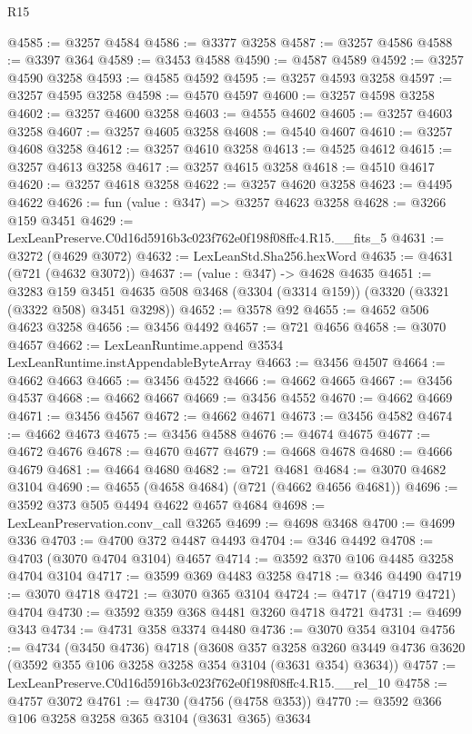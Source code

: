 \begin{lexlean}{R15}
\begin{coremodule}
@4585 := @3257 @4584
@4586 := @3377 @3258
@4587 := @3257 @4586
@4588 := @3397 @364
@4589 := @3453 @4588
@4590 := @4587 @4589
@4592 := @3257 @4590 @3258
@4593 := @4585 @4592
@4595 := @3257 @4593 @3258
@4597 := @3257 @4595 @3258
@4598 := @4570 @4597
@4600 := @3257 @4598 @3258
@4602 := @3257 @4600 @3258
@4603 := @4555 @4602
@4605 := @3257 @4603 @3258
@4607 := @3257 @4605 @3258
@4608 := @4540 @4607
@4610 := @3257 @4608 @3258
@4612 := @3257 @4610 @3258
@4613 := @4525 @4612
@4615 := @3257 @4613 @3258
@4617 := @3257 @4615 @3258
@4618 := @4510 @4617
@4620 := @3257 @4618 @3258
@4622 := @3257 @4620 @3258
@4623 := @4495 @4622
@4626 := fun (value : @347) => @3257 @4623 @3258
@4628 := @3266 @159 @3451
@4629 := LexLeanPreserve.C0d16d5916b3c023f762e0f198f08ffc4.R15.__fits_5
@4631 := @3272 (@4629 @3072)
@4632 := LexLeanStd.Sha256.hexWord
@4635 := @4631 (@721 (@4632 @3072))
@4637 := (value : @347) -> @4628 @4635
@4651 := @3283
    @159
    @3451
    @4635
    @508
    @3468
    (@3304 (@3314 @159))
    (@3320 (@3321 (@3322 @508) @3451 @3298))
@4652 := @3578 @92
@4655 := @4652 @506 @4623 @3258
@4656 := @3456 @4492
@4657 := @721 @4656
@4658 := @3070 @4657
@4662 := LexLeanRuntime.append @3534 LexLeanRuntime.instAppendableByteArray
@4663 := @3456 @4507
@4664 := @4662 @4663
@4665 := @3456 @4522
@4666 := @4662 @4665
@4667 := @3456 @4537
@4668 := @4662 @4667
@4669 := @3456 @4552
@4670 := @4662 @4669
@4671 := @3456 @4567
@4672 := @4662 @4671
@4673 := @3456 @4582
@4674 := @4662 @4673
@4675 := @3456 @4588
@4676 := @4674 @4675
@4677 := @4672 @4676
@4678 := @4670 @4677
@4679 := @4668 @4678
@4680 := @4666 @4679
@4681 := @4664 @4680
@4682 := @721 @4681
@4684 := @3070 @4682 @3104
@4690 := @4655 (@4658 @4684) (@721 (@4662 @4656 @4681))
@4696 := @3592 @373 @505 @4494 @4622 @4657 @4684
@4698 := LexLeanPreservation.conv_call @3265
@4699 := @4698 @3468
@4700 := @4699 @336
@4703 := @4700 @372 @4487 @4493
@4704 := @346 @4492
@4708 := @4703 (@3070 @4704 @3104) @4657
@4714 := @3592 @370 @106 @4485 @3258 @4704 @3104
@4717 := @3599 @369 @4483 @3258
@4718 := @346 @4490
@4719 := @3070 @4718
@4721 := @3070 @365 @3104
@4724 := @4717 (@4719 @4721) @4704
@4730 := @3592 @359 @368 @4481 @3260 @4718 @4721
@4731 := @4699 @343
@4734 := @4731 @358 @3374 @4480
@4736 := @3070 @354 @3104
@4756 := @4734
    (@3450 @4736)
    @4718
    (@3608
      @357
      @3258
      @3260
      @3449
      @4736
      @3620
      (@3592 @355 @106 @3258 @3258 @354 @3104 (@3631 @354) @3634))
@4757 := LexLeanPreserve.C0d16d5916b3c023f762e0f198f08ffc4.R15.__rel_10
@4758 := @4757 @3072
@4761 := @4730 (@4756 (@4758 @353))
@4770 := @3592 @366 @106 @3258 @3258 @365 @3104 (@3631 @365) @3634

\end{coremodule}
\end{lexlean}
